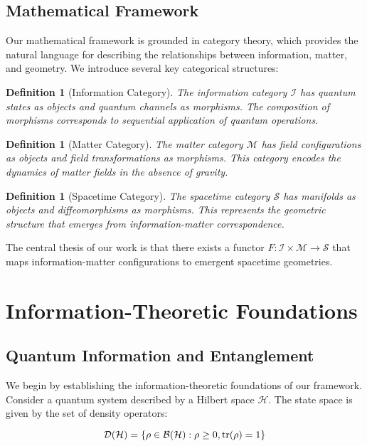 \documentclass[12pt,a4paper]{article}
\newtheorem{definition}[theorem]{Definition}
\begin{document}
\subsection{Mathematical Framework}

Our mathematical framework is grounded in category theory, which provides the natural language for describing the relationships between information, matter, and geometry. We introduce several key categorical structures:

\begin{definition}[Information Category]
The information category $\mathcal{I}$ has quantum states as objects and quantum channels as morphisms. The composition of morphisms corresponds to sequential application of quantum operations.
\end{definition}

\begin{definition}[Matter Category]
The matter category $\mathcal{M}$ has field configurations as objects and field transformations as morphisms. This category encodes the dynamics of matter fields in the absence of gravity.
\end{definition}

\begin{definition}[Spacetime Category]
The spacetime category $\mathcal{S}$ has manifolds as objects and diffeomorphisms as morphisms. This represents the geometric structure that emerges from information-matter correspondence.
\end{definition}

The central thesis of our work is that there exists a functor $F: \mathcal{I} \times \mathcal{M} \to \mathcal{S}$ that maps information-matter configurations to emergent spacetime geometries.

\section{Information-Theoretic Foundations}

\subsection{Quantum Information and Entanglement}

We begin by establishing the information-theoretic foundations of our framework. Consider a quantum system described by a Hilbert space $\mathcal{H}$. The state space is given by the set of density operators:

\begin{equation}
\mathcal{D}(\mathcal{H}) = \{\rho \in \mathcal{B}(\mathcal{H}) : \rho \geq 0, \tr(\rho) = 1\}
\end{equation}
\end{document}

